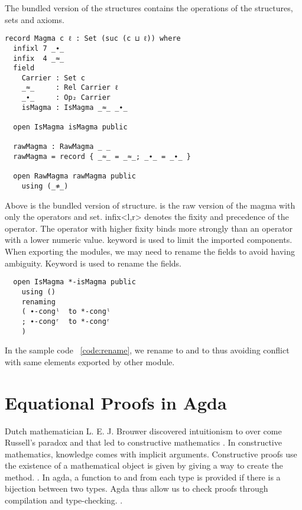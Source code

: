 The bundled version of the structures contains the operations of the structures,
sets and axioms. 
\begin{verbatim}
record Magma c ℓ : Set (suc (c ⊔ ℓ)) where
  infixl 7 _∙_
  infix  4 _≈_
  field
    Carrier : Set c
    _≈_     : Rel Carrier ℓ
    _∙_     : Op₂ Carrier
    isMagma : IsMagma _≈_ _∙_

  open IsMagma isMagma public

  rawMagma : RawMagma _ _
  rawMagma = record { _≈_ = _≈_; _∙_ = _∙_ }

  open RawMagma rawMagma public
    using (_≉_)
\end{verbatim}
Above is the bundled version of  structure.  is
the raw version of the magma with only the operators and set. infix<l,r> denotes
the fixity and precedence of the operator. The operator with higher fixity binds
more strongly than an operator with a lower numeric value. 
keyword is used to limit the imported components. When exporting the modules, we
may need to rename the fields to avoid having ambiguity. Keyword
 is used to rename the fields.
\label{code:rename}
\begin{verbatim}
  open IsMagma *-isMagma public
    using ()
    renaming
    ( ∙-congˡ  to *-congˡ
    ; ∙-congʳ  to *-congʳ
    )
\end{verbatim} 
In the sample code ~\ref{code:rename}, we rename   to 
and   to  thus avoiding conflict with same
elements exported by other module.

\section{Equational Proofs in Agda}
Dutch mathematician L. E. J. Brouwer discovered intuitionism to over come
Russell's paradox and that led to constructive mathematics \cite{enwiki:1122615242}.
In constructive mathematics, knowledge comes with implicit arguments.
Constructive proofs use the existence of a mathematical object is given by
giving a way to create the method. \cite{enwiki:1090644431}. In agda, a function
to and from each type is provided if there is a bijection between two types.
Agda thus allow us to check proofs through compilation and type-checking.
\cite{kidney2020finiteness}.  

